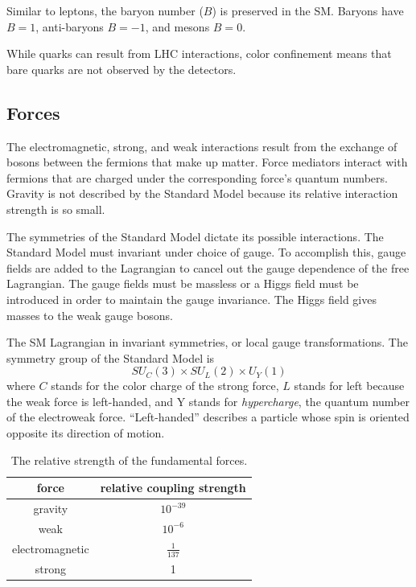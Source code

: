 Similar to leptons, the baryon number ($B$) is preserved in the \ac{SM}. Baryons have $B = 1$, anti-baryons $B=-1$, and mesons $B=0$.

While quarks can result from \ac{LHC} interactions, color confinement means that bare quarks are not observed by the detectors.

\subsection{Forces}

The electromagnetic, strong, and weak interactions result from the exchange of bosons between the fermions that make up matter. Force mediators interact with fermions that are charged under the corresponding force's quantum numbers. Gravity is not described by the Standard Model because its relative interaction strength is so small.

The symmetries of the Standard Model dictate its possible interactions. The Standard Model must invariant under choice of gauge. To accomplish this, gauge fields are added to the Lagrangian to cancel out the gauge dependence of the free Lagrangian. The gauge fields must be massless or a Higgs field must be introduced in order to maintain the gauge invariance. The Higgs field gives masses to the weak gauge bosons.

The \ac{SM} Lagrangian in invariant symmetries, or local gauge transformations. The symmetry group of the Standard Model is 
\begin{equation}
SU_{C}(3) \times SU_{L}(2) \times U_{Y}(1) 
\end{equation}
where $C$ stands for the color charge of the strong force, $L$ stands for left because the weak force is left-handed, and Y stands for \emph{hypercharge}, the quantum number of the electroweak force. ``Left-handed'' describes a particle whose spin is oriented opposite its direction of motion. 


\begin{table}[htb]
\begin{center}
\begin{tabular}{cc}
 force & relative coupling strength \\
 \hline
  gravity   &  $10^{-39}$    \\
  weak      &  $10^{-6}$     \\
  electromagnetic  &  $\frac{1}{137} $   \\
  strong  &  1     \\
\hline
\end{tabular}
\caption{The relative strength of the fundamental forces.}
\end{center}
\end{table}


